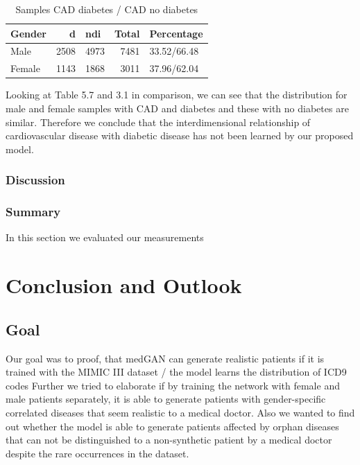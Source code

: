 \documentclass[11pt, a4paper]{book}
\begin{document}
\begin{table}
\begin{tabularx}{\textwidth}{p{}|r|X|r}
Gender & d & ndi & Total & Percentage\\
\hline
Male 	& 2508 & 4973 & 7481 & 33.52/66.48\\
Female & 1143 & 1868 & 3011 & 37.96/62.04\\
\end{tabularx}
\caption{\label{tab:cad-diabetic-synth}Samples CAD diabetes / CAD no diabetes}
\end{table}

Looking at Table 5.7 and 3.1 in comparison, we can see that the distribution for male and female samples with CAD and diabetes and these with no diabetes are similar. Therefore we conclude that the interdimensional relationship of cardiovascular disease with diabetic disease has not been learned by our proposed model.



\subsection{Discussion}

\subsection{Summary}
In this section we evaluated our measurements

\chapter{Conclusion and Outlook}
\section{Goal}
Our goal was to proof, that medGAN can generate realistic patients if it is trained with the MIMIC III dataset / the model learns the distribution of ICD9 codes 
Further we tried to elaborate if by training the network with female and male patients separately, it is able to generate patients with gender-specific correlated diseases that seem realistic to a medical doctor.
Also we wanted to find out whether the model is able to generate patients affected by orphan diseases that can not be distinguished to a non-synthetic patient by a medical doctor despite the rare occurrences in the dataset.
\end{document}
